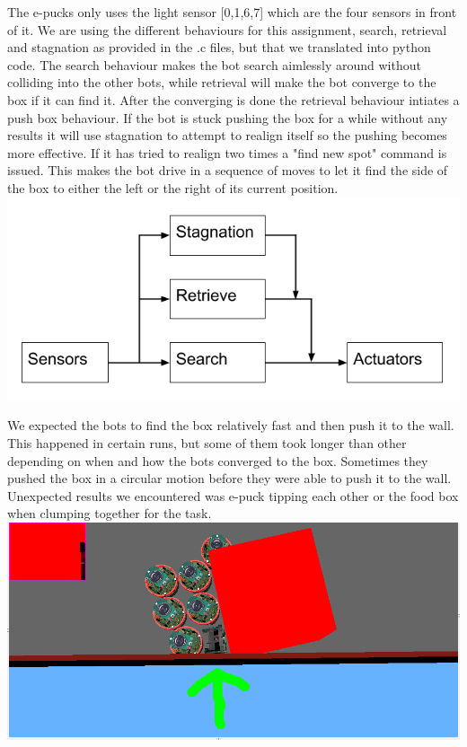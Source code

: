 \documentclass[12pt, a4paper]{article}
\begin{document}
The e-pucks only uses the light sensor [0,1,6,7] which are the four sensors in front of it. We are using the different behaviours for this assignment, search, retrieval and stagnation as provided in the .c files, but that we translated into python code. 
The search behaviour makes the bot search aimlessly around without colliding into the other bots, while retrieval will make the bot converge to the box if it can find it. After the converging is done the retrieval behaviour intiates a push box behaviour. If the bot is stuck pushing the box for a while without any results it will use stagnation to attempt to realign itself so the pushing becomes more effective. If it has tried to realign two times a "find new spot" command is issued. This makes the bot drive in a sequence of moves to let it find the side of the box to either the left or the right of its current position.
\includegraphics[width=\linewidth]{Brooks-lite.png}


We expected the bots to find the box relatively fast and then push it to the wall. This happened in certain runs, but some of them took longer than other depending on when and how the bots converged to the box. Sometimes they pushed the box in a circular motion before they were able to push it to the wall.
Unexpected results we encountered was e-puck tipping each other or the food box when clumping together for the task.\\
\includegraphics[width=\linewidth]{1.mandown.png}
\end{document}
